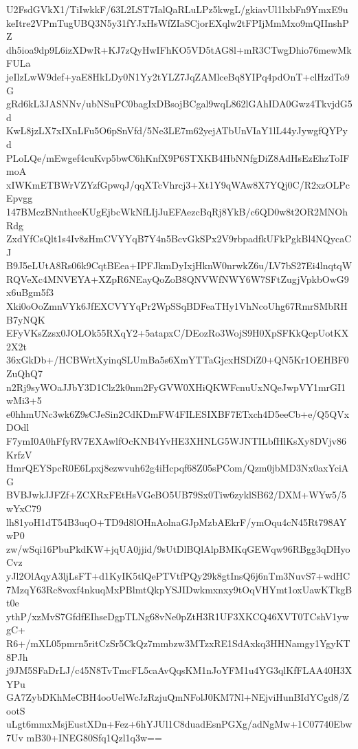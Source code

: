 U2FsdGVkX1/TiIwkkF/63L2LST7IalQaRLuLPz5kwgL/gkiavUl1lxbFn9YmxE9u
keItre2VPmTugUBQ3N5y31fYJxHsWfZIaSCjorEXqlw2tFPIjMmMxo9mQIInshPZ
dh5ioa9dp9L6izXDwR+KJ7zQyHwIFhKO5VD5tAG8l+mR3CTwgDhio76mewMkFULa
jeIlzLwW9def+yaE8HkLDy0N1Yy2tYLZ7JqZAMlceBq8YIPq4pdOnT+clHzdTo9G
gRd6kL3JASNNv/ubNSuPC0bagIxDBsojBCgal9wqL862lGAhIDA0Gwz4TkvjdG5d
KwL8jzLX7xIXnLFu5O6pSnVfd/5Ne3LE7m62yejATbUnVIaY1lL44yJywgfQYPyd
PLoLQe/mEwgef4cuKvp5bwC6hKnfX9P6STXKB4HbNNfgDiZ8AdHsEzEhzToIFmoA
xIWKmETBWrVZYzfGpwqJ/qqXTcVhrcj3+Xt1Y9qWAw8X7YQj0C/R2xzOLPcEpvgg
147BMczBNntheeKUgEjbcWkNfLIjJuEFAezcBqRj8YkB/c6QD0w8t2OR2MNOhRdg
ZxdYfCsQlt1s4Iv8zHmCVYYqB7Y4n5BcvGkSPx2V9rbpadfkUFkPgkBl4NQycaCJ
B9J5eLUtA8Rs06k9CqtBEea+IPFJkmDyIxjHknW0nrwkZ6u/LV7bS27Ei4lnqtqW
RQVeXc4MNVEYA+XZpR6NEayQoZoB8QNVWfNWY6W7SFtZugjVpkbOwG9x6uBgm5f3
Xki0oOoZmnVYk6JfEXCVYYqPr2WpSSqBDFeaTHy1VhNcoUhg67RmrSMbRHB7yNQK
EFyVKsZzsx0JOLOk55RXqY2+5atapxC/DEozRo3WojS9H0XpSFKkQcpUotKX2X2t
36xGkDb+/HCBWrtXyinqSLUmBa5s6XmYTTaGjcxHSDiZ0+QN5Kr1OEHBF0ZuQhQ7
n2Rj9syWOaJJbY3D1Clz2k0nm2FyGVW0XHiQKWFcnuUxNQeJwpVY1mrGI1wMi3+5
e0hhmUNc3wk6Z9sCJeSin2CdKDmFW4FILESIXBF7ETxch4D5eeCb+e/Q5QVxDOdl
F7ymI0A0hFfyRV7EXAwlfOcKNB4YvHE3XHNLG5WJNTILbfHlKsXy8DVjv86KrfzV
HmrQEYSpcR0E6Lpxj8ezwvuh62g4iHcpqf68Z05sPCom/Qzm0jbMD3Nx0axYciAG
BVBJwkJJFZf+ZCXRxFEtHsVGeBO5UB79Sx0Tiw6zyklSB62/DXM+WYw5/5wYxC79
lh81yoH1dT54B3uqO+TD9d8lOHnAolnaGJpMzbAEkrF/ymOqu4cN45Rt798AYwP0
zw/wSqi16PbuPkdKW+jqUA0jjid/9sUtDlBQlAlpBMKqGEWqw96RBgg3qDHyoCvz
yJl2OlAqyA3ljLsFT+d1KyIK5tlQePTVtfPQy29k8gtInsQ6j6nTm3NuvS7+wdHC
7MzqY63Rc8voxf4nkuqMxPBlmtQkpYSJIDwkmxnxy9tOqVHYmt1oxUawKTkgBt0e
ythP/xzMvS7GfdfEIhseDgpTLNg68vNe0pZtH3R1UF3XKCQ46XVT0TCshV1ywgC+
R6+/mXL05pmrn5ritCzSr5CkQz7mmbzw3MTzxRE1SdAxkq3HHNamgy1YgyKT8PJh
j9JM5SFaDrLJ/c45N8TvTmcFL5caAvQqsKM1nJoYFM1u4YG3qlKfFLAA40H3XYPu
GA7ZybDKhMeCBH4ooUelWcJzRzjuQmNFolJ0KM7Nl+NEjviHunBIdYCgd8/ZootS
uLgt6mmxMsjEustXDn+Fez+6hYJUl1C8duadEsnPGXg/adNgMw+1C07740Ebw7Uv
mB30+INEG80Sfq1Qzl1q3w==
